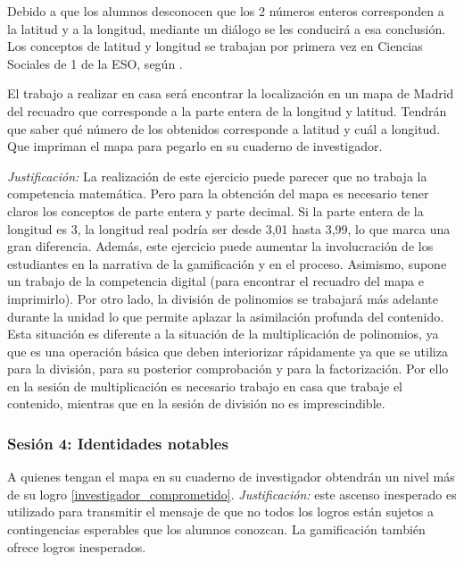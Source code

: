 Debido a que los alumnos desconocen que los 2 números enteros corresponden a la latitud y a la longitud, mediante un diálogo se les conducirá a esa conclusión.
%
Los conceptos de latitud y longitud se trabajan por primera vez en Ciencias Sociales de 1 de la ESO, según \bocm.


El trabajo a realizar en casa será encontrar la localización en un mapa de Madrid del recuadro que corresponde a la parte entera de la longitud y latitud.
%
Tendrán que saber qué número de los obtenidos corresponde a latitud y cuál a longitud.
%
Que impriman el mapa para pegarlo en su cuaderno de investigador.

\textit{
	Justificación:
}
%
La realización de este ejercicio puede parecer que no trabaja la competencia matemática. 
%
Pero para la obtención del mapa es necesario tener claros los conceptos de parte entera y parte decimal.
%
Si la parte entera de la longitud es 3, la longitud real podría ser desde 3,01 hasta 3,99, lo que marca una gran diferencia.
%
Además, este ejercicio puede aumentar la involucración de los estudiantes en la narrativa de la gamificación y en el proceso.
%
Asimismo, supone un trabajo de la competencia digital (para encontrar el recuadro del mapa e imprimirlo).
%
Por otro lado, la división de polinomios se trabajará más adelante durante la unidad lo que permite aplazar la asimilación profunda del contenido.
%
Esta situación es diferente a la situación de la multiplicación de polinomios, ya que es una operación básica que deben interiorizar rápidamente ya que se utiliza para la división, para su posterior comprobación y para la factorización.
%
Por ello en la sesión de multiplicación es necesario trabajo en casa que trabaje el contenido, mientras que en la sesión de división no es imprescindible.



\subsubsection{Sesión 4: Identidades notables}

A quienes tengan el mapa en su cuaderno de investigador obtendrán un nivel más de su logro \ref{investigador_comprometido}.
%
\textit{Justificación:} este ascenso inesperado es utilizado para transmitir el mensaje de que no todos los logros están sujetos a contingencias esperables que los alumnos conozcan.
%
La gamificación también ofrece logros inesperados.
%


